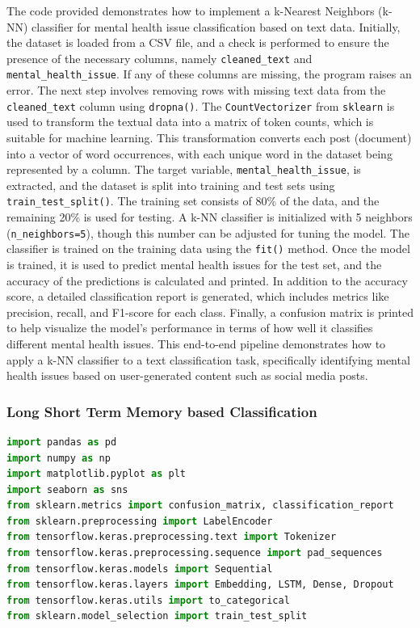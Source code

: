 \noindent
The code provided demonstrates how to implement a k-Nearest Neighbors (k-NN) classifier for mental health issue classification based on text data. Initially, the dataset is loaded from a CSV file, and a check is performed to ensure the presence of the necessary columns, namely \texttt{cleaned\_text} and \texttt{mental\_health\_issue}. If any of these columns are missing, the program raises an error. The next step involves removing rows with missing text data from the \texttt{cleaned\_text} column using \texttt{dropna()}. The \texttt{CountVectorizer} from \texttt{sklearn} is used to transform the textual data into a matrix of token counts, which is suitable for machine learning. This transformation converts each post (document) into a vector of word occurrences, with each unique word in the dataset being represented by a column. The target variable, \texttt{mental\_health\_issue}, is extracted, and the dataset is split into training and test sets using \texttt{train\_test\_split()}. The training set consists of 80\% of the data, and the remaining 20\% is used for testing. A k-NN classifier is initialized with 5 neighbors (\texttt{n\_neighbors=5}), though this number can be adjusted for tuning the model. The classifier is trained on the training data using the \texttt{fit()} method. Once the model is trained, it is used to predict mental health issues for the test set, and the accuracy of the predictions is calculated and printed. In addition to the accuracy score, a detailed classification report is generated, which includes metrics like precision, recall, and F1-score for each class. Finally, a confusion matrix is printed to help visualize the model’s performance in terms of how well it classifies different mental health issues. This end-to-end pipeline demonstrates how to apply a k-NN classifier to a text classification task, specifically identifying mental health issues based on user-generated content such as social media posts.


\subsubsection{Long Short Term Memory based Classification}

\begin{tcolorbox}[colback=gray!5!white, colframe=gray!80!black, boxrule=0.5pt, title=LSTM Model Implementation]
    \begin{lstlisting}[language=Python]
import pandas as pd
import numpy as np
import matplotlib.pyplot as plt
import seaborn as sns
from sklearn.metrics import confusion_matrix, classification_report
from sklearn.preprocessing import LabelEncoder
from tensorflow.keras.preprocessing.text import Tokenizer
from tensorflow.keras.preprocessing.sequence import pad_sequences
from tensorflow.keras.models import Sequential
from tensorflow.keras.layers import Embedding, LSTM, Dense, Dropout
from tensorflow.keras.utils import to_categorical
from sklearn.model_selection import train_test_split
\end{lstlisting}
\end{tcolorbox}

